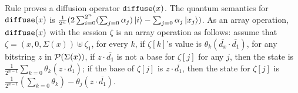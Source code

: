 Rule  proves a diffusion operator $\texttt{diffuse}(x)$.
The quantum semantics for $\texttt{diffuse}(x)$ is $\frac{1}{2^{n}}(2\sum_{i=0}^{2^n}(\sum_{j=0}\alpha_j)\left\vert{i}\right\rangle - \sum_{j=0}\alpha_j\left\vert{x_j}\right\rangle)$.
As an array operation, $\texttt{diffuse}(x)$ with the session $\zeta$ is an array operation as follows:
assume that $\zeta=(x,0,\Sigma(x))\uplus\zeta_1$, for every $k$,
if $\zeta[k]$'s value is $\theta_k(\overline{d_x}\cdot \overline{d_1})$,
for any bitstring $z$ in $\mathcal{P}(\Sigma(x))$, if $z\cdot \overline{d_1}$
is not a base for $\zeta[j]$ for any $j$, then the state is
$\frac{1}{2^{n-1}}\sum_{k=0}\theta_k(z\cdot \overline{d_1})$;
if the base of $\zeta[j]$ is $z\cdot \overline{d_1}$,
then the state for $\zeta[j]$ is $\frac{1}{2^{n-1}}(\sum_{k=0}\theta_k)-\theta_j(z\cdot \overline{d_1})$.







